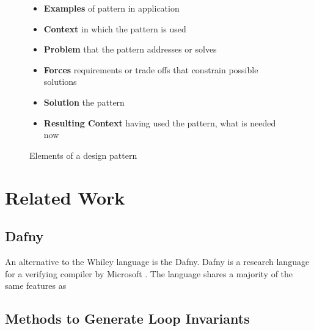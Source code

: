 \begin{figure}[ht]
\begin{itemize}
    \item{\textbf{Examples} of pattern in application}
    \item{\textbf{Context} in which the pattern is used}
    \item{\textbf{Problem} that the pattern addresses or solves}
    \item{\textbf{Forces} requirements or trade offs that constrain possible
        solutions}
    \item{\textbf{Solution} the pattern}
    \item{\textbf{Resulting Context} having used the pattern, what is needed
        now}
\end{itemize}
    \caption{Elements of a design pattern\cite{pattern-lang}}
    \label{l:design-pattern}
\end{figure}


\cite{pattern-lang}

\section{Related Work}


\subsection{Dafny}

An alternative to the Whiley language is the Dafny.
Dafny is a research language for a verifying compiler by Microsoft
\cite{dafny-lang}.
The language shares a majority of the same features as

\cite{dafny-started}
\cite{dafny-lang}
\cite{dafny-mech}

\subsection{Methods to Generate Loop Invariants}

